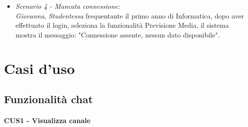 \begin{itemize}
	\item \textit{Scenario 4 - Mancata connessione:\\}
	\textit {Giovanna}, \textit {Studentessa} frequentante il primo anno di Informatica, dopo aver effettuato il login, seleziona la funzionalità Previsione Media, il sistema mostra il messaggio: "Connessione assente, nessun dato disponibile".\\
\end{itemize}

\clearpage

\section{Casi d'uso}

\subsection{Funzionalità chat}

\paragraph{CUS1 - Visualizza canale \\}

